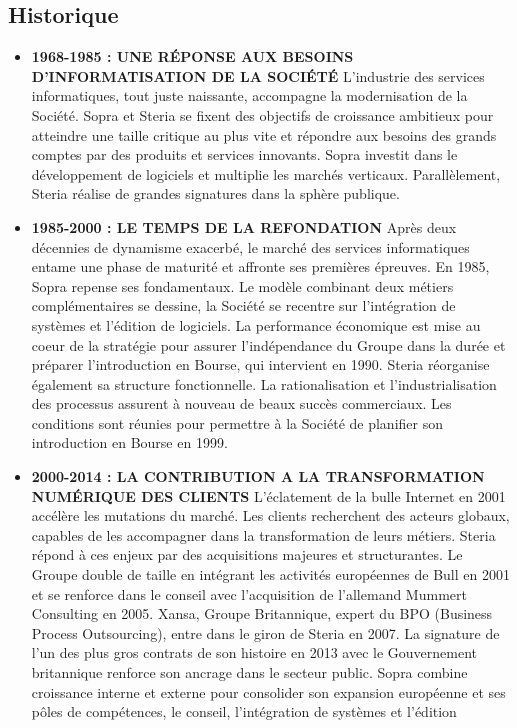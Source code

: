 \subsection{Historique}
\begin{itemize}
\item \textbf{1968-1985 : UNE RÉPONSE AUX BESOINS D'INFORMATISATION DE
	LA SOCIÉTÉ } L'industrie des services informatiques, tout juste naissante, accompagne la
modernisation de la Société. Sopra et Steria se fixent des objectifs de croissance ambitieux
pour atteindre une taille critique au plus vite et répondre aux besoins des grands comptes
par des produits et services innovants. Sopra investit dans le développement de logiciels et
multiplie les marchés verticaux. Parallèlement, Steria réalise de grandes signatures dans
la sphère publique.
\item \textbf{1985-2000 : LE TEMPS DE LA REFONDATION }Après deux décennies de dynamisme
exacerbé, le marché des services informatiques entame une phase de maturité
et affronte ses premières épreuves. En 1985, Sopra repense ses fondamentaux. Le modèle
combinant deux métiers complémentaires se dessine, la Société se recentre sur l'intégration
de systèmes et l'édition de logiciels. La performance économique est mise au coeur de la
stratégie pour assurer l'indépendance du Groupe dans la durée et préparer l'introduction
en Bourse, qui intervient en 1990. Steria réorganise également sa structure fonctionnelle. La rationalisation et l'industrialisation
des processus assurent à nouveau de beaux succès commerciaux. Les conditions
sont réunies pour permettre à la Société de planifier son introduction en Bourse en 1999. 
\item \textbf{2000-2014 : LA CONTRIBUTION A LA TRANSFORMATION NUMÉRIQUE
	DES CLIENTS }L'éclatement de la bulle Internet en 2001 accélère les mutations du
marché. Les clients recherchent des acteurs globaux, capables de les accompagner dans
la transformation de leurs métiers. Steria répond à ces enjeux par des acquisitions majeures
et structurantes. Le Groupe double de taille en intégrant les activités européennes
de Bull en 2001 et se renforce dans le conseil avec l'acquisition de l'allemand Mummert
Consulting en 2005. Xansa, Groupe Britannique, expert du BPO (Business Process Outsourcing),
entre dans le giron de Steria en 2007. La signature de l'un des plus gros contrats
de son histoire en 2013 avec le Gouvernement britannique renforce son ancrage dans le
secteur public. Sopra combine croissance interne et externe pour consolider son expansion
européenne et ses pôles de compétences, le conseil, l'intégration de systèmes et l'édition

\end{itemize}
